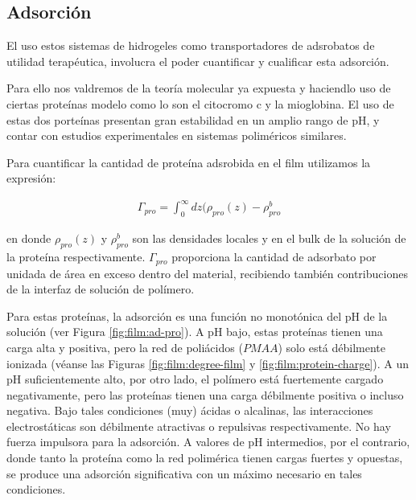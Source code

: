 \subsection{Adsorci\'on}

El uso estos sistemas de hidrogeles como transportadores de adsrobatos de utilidad terap\'eutica, involucra el poder cuantificar y cualificar esta adsorci\'on.
 
Para ello nos valdremos de la teor\'ia molecular ya expuesta y haciendlo uso de ciertas prote\'inas modelo como lo son el citocromo c y la mioglobina. El uso de estas dos porte\'inas presentan gran estabilidad en un amplio rango de pH, y contar con estudios experimentales en sistemas polim\'ericos similares.

Para cuantificar la cantidad de prote\'ina adsrobida en el film utilizamos la expresi\'on:

\begin{align}
\Gamma_{pro} = \int^\infty_0 {dz(\rho_{pro}(z) -\rho^b_{pro}}  
\label{adsor}
\end{align}

en donde $\rho_{pro}(z)$ y $\rho^b_{pro}$ son las densidades locales y en el bulk de la soluci\'on de la prote\'ina respectivamente.
$\Gamma_{pro}$ proporciona la cantidad de adsorbato por unidada de \'area en exceso dentro del material, recibiendo tambi\'en contribuciones de la interfaz de soluci\'on de pol\'imero.

Para estas prote\'inas, la adsorci\'on es una funci\'on no monot\'onica del pH de la soluci\'on (ver Figura \ref{fig:film:ad-pro}). A pH bajo, estas prote\'inas tienen una carga alta y positiva, pero la red de poli\'acidos ($PMAA$) solo est\'a d\'ebilmente ionizada (v\'eanse las Figuras \ref{fig:film:degree-film} y \ref{fig:film:protein-charge}). A un pH suficientemente alto, por otro lado, el pol\'imero est\'a fuertemente cargado negativamente, pero las prote\'inas tienen una carga d\'ebilmente positiva o incluso negativa. Bajo tales condiciones (muy) \'acidas o alcalinas, las interacciones electrost\'aticas son d\'ebilmente atractivas o repulsivas respectivamente. No hay fuerza impulsora para la adsorci\'on. A valores de pH intermedios, por el contrario, donde tanto la prote\'ina como la red polim\'erica tienen cargas fuertes y opuestas, se produce una adsorci\'on significativa con un m\'aximo necesario en tales condiciones.

